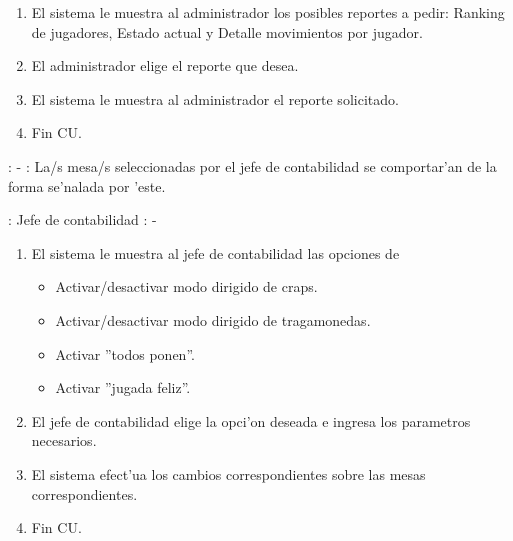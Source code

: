 \begin{enumerate}
\item El sistema le muestra al administrador los posibles reportes a pedir: Ranking de jugadores, Estado actual y Detalle movimientos por jugador.
\item El administrador elige el reporte que desea.
\item El sistema le muestra al administrador el reporte solicitado.
\item Fin CU.
\end{enumerate}




: - \newline
\indent{}: La/s mesa/s seleccionadas por el jefe de contabilidad se comportar'an de la forma se'nalada por 'este.

: Jefe de contabilidad \newline
\indent{}: -

\begin{enumerate}
\item El sistema le muestra al jefe de contabilidad las opciones de
	\begin{itemize}
	\item Activar/desactivar modo dirigido de craps.
	\item Activar/desactivar modo dirigido de tragamonedas.
	\item Activar ''todos ponen''.
	\item Activar ''jugada feliz''.
	\end{itemize}
\item El jefe de contabilidad elige la opci'on deseada e ingresa los parametros necesarios.
\item El sistema efect'ua los cambios correspondientes sobre las mesas correspondientes.
\item Fin CU.
\end{enumerate}


